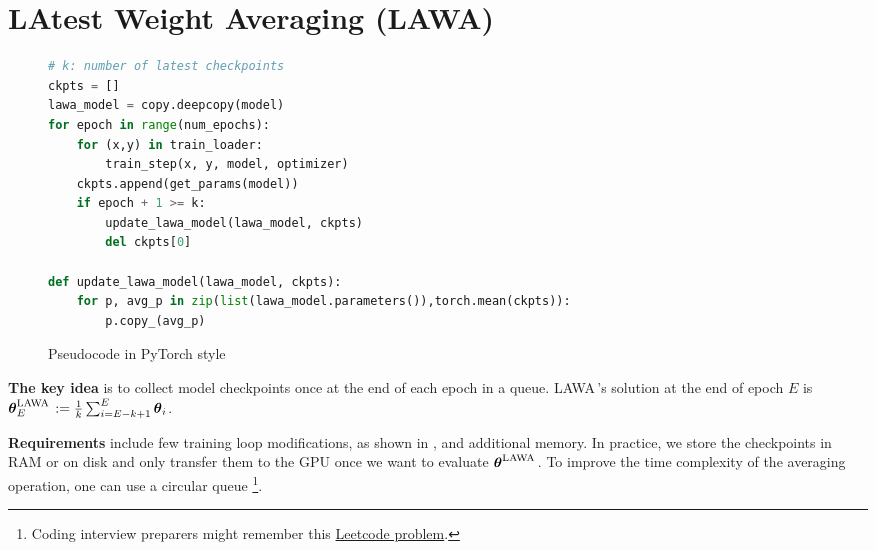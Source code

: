 \documentclass{article}
\newcommand{\params}{\boldsymbol{\theta}}
\newcommand{\method}{LAWA\,}
\newcommand{\lawasol}{\params^{\text{\method}}}
\begin{document}
\section{LAtest Weight Averaging (LAWA)}
\begin{figure}
\vspace{-6ex}
\begin{center}
\begin{minipage}{0.45\textwidth}
\begin{algorithm}[H]
\caption{Pseudocode in PyTorch style}

\vspace{-1.2ex}
\begin{lstlisting}[language=python]
# k: number of latest checkpoints
ckpts = []
lawa_model = copy.deepcopy(model)
for epoch in range(num_epochs):
    for (x,y) in train_loader:
        train_step(x, y, model, optimizer)
    ckpts.append(get_params(model))
    if epoch + 1 >= k:
        update_lawa_model(lawa_model, ckpts)
        del ckpts[0]

def update_lawa_model(lawa_model, ckpts):
    for p, avg_p in zip(list(lawa_model.parameters()),torch.mean(ckpts)):
        p.copy_(avg_p)
\end{lstlisting}
\vspace{-1.5ex}
\label{alg:lawa}
\end{algorithm}
\end{minipage}
\vspace{-5ex}
\end{center}
\end{figure}


\textbf{The key idea} is to collect model checkpoints once at the end of each epoch in a queue. 
\method's solution at the end of epoch $E$ is $\lawasol_E := \frac{1}{k} \sum_{i=E-k+1}^{E} \params_i$. 


\textbf{Requirements} include few training loop modifications, as shown in , and additional memory. In practice, we store the checkpoints in RAM or on disk and only transfer them to the GPU once we want to evaluate $\lawasol$. To improve the time complexity of the averaging operation, one can use a circular queue \footnote{Coding interview preparers might remember this \href{https://leetcode.com/problems/moving-average-from-data-stream/}{Leetcode problem}.}.
\end{document}
